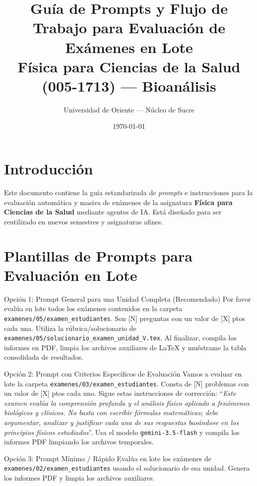 \documentclass[12pt,letterpaper]{article}
\title{\textbf{Guía de Prompts y Flujo de Trabajo para Evaluación de Exámenes en Lote}\\[0.3em]
\large Física para Ciencias de la Salud (005-1713) --- Bioanálisis}
\author{Universidad de Oriente --- Núcleo de Sucre}
\date{\today}
\begin{document}
\maketitle

\section{Introducción}
Este documento contiene la guía estandarizada de \textit{prompts} e instrucciones para la evaluación automática y masiva de exámenes de la asignatura \textbf{Física para Ciencias de la Salud} mediante agentes de IA. Está diseñado para ser reutilizado en nuevos semestres y asignaturas afines.

\section{Plantillas de Prompts para Evaluación en Lote}

\begin{promptbox}{Opción 1: Prompt General para una Unidad Completa (Recomendado)}
Por favor evalúa en lote todos los exámenes contenidos en la carpeta \texttt{examenes/05/examen\_estudiantes}. Son [N] preguntas con un valor de [X] ptos cada una. Utiliza la rúbrica/solucionario de \texttt{examenes/05/solucionario\_examen\_unidad\_V.tex}. Al finalizar, compila los informes en PDF, limpia los archivos auxiliares de LaTeX y muéstrame la tabla consolidada de resultados.
\end{promptbox}

\vspace{0.5em}

\begin{promptbox}{Opción 2: Prompt con Criterios Específicos de Evaluación}
Vamos a evaluar en lote la carpeta \texttt{examenes/03/examen\_estudiantes}. Consta de [N] problemas con un valor de [X] ptos cada uno. Sigue estas instrucciones de corrección: ``\textit{Este examen evalúa la comprensión profunda y el análisis físico aplicado a fenómenos biológicos y clínicos. No basta con escribir fórmulas matemáticas; debe argumentar, analizar y justificar cada una de sus respuestas basándose en los principios físicos estudiados}''. Usa el modelo \texttt{gemini-3.5-flash} y compila los informes PDF limpiando los archivos temporales.
\end{promptbox}

\vspace{0.5em}

\begin{promptbox}{Opción 3: Prompt Mínimo / Rápido}
Evalúa en lote los exámenes de \texttt{examenes/02/examen\_estudiantes} usando el solucionario de esa unidad. Genera los informes PDF y limpia los archivos auxiliares.
\end{promptbox}
\end{document}
